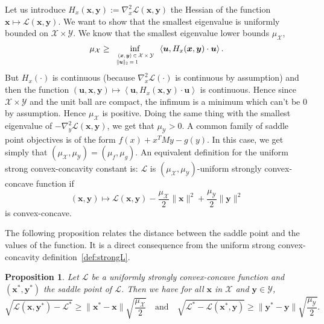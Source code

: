 \documentclass[twoside]{article}
\renewcommand{\L}{\mathcal{L}}
\newcommand{\X}{\mathcal{X}}
\newcommand{\Y}{\mathcal{Y}}
\newcommand{\M}{\X \times \Y}
\newcommand{\prodscal}[2]{\left\langle#1,#2\right\rangle}
\newcommand{\x}{\bm{x}}
\newcommand{\y}{\bm{y}}
\renewcommand{\u}{\bm{u}}
\newtheorem{proposition}[definition]{Proposition}
\newcommand{\0}{\mathbf{0}} %
\begin{document}
  \proof
    Let us introduce $H_x(\x,\y):= \nabla_x^2 \L(\x,\y)$ the Hessian of the function $\x \mapsto \L(\x,\y)$. We want to show that the smallest eigenvalue is uniformly bounded on $\M$. We know that the smallest eigenvalue lower bounds $\mu_\X$,
      \begin{equation} 
        \mu_{\X} \geq \inf_{\substack{\scalebox{0.65}{
                $\begin{array}{ll}
                    \; (\x,\y) \in \M \\
                    \|\u\|_2=1
                \end{array}$
                }}} \prodscal{\u}{H_x(\x,\y) \cdot\u}.
      \end{equation}
    But $H_x(\cdot)$ is continuous (because $\nabla_x^2 \L(\cdot)$ is continuous by assumption) and then the function $(\u,\x,\y) \mapsto \prodscal{\u}{H_x(\x,\y) \cdot\u}$ is continuous. 
    Hence since $\M$ and the unit ball are compact, the infimum is a minimum which can't be 0 by assumption. Hence $\mu_\X$ is positive. 
    Doing the same thing with the smallest eigenvalue of $-\nabla_y^2 \L(\x,\y)$, we get that 
    $\mu_\Y>0$.
  \endproof
  A common  family of saddle point objectives is of the form $f(x) +x^TMy - g(y)$. In this case, we get simply that $\left( \mu_\X, \mu_\Y \right) = (\mu_f,\mu_g).$
  An equivalent definition for the uniform strong convex-concavity constant is: $\L$ is $(\mu_\X,\mu_\Y)$-uniform strongly convex-concave function if
  \begin{equation}
    \left( \x,\y \right) \mapsto\L(\x,\y) - \frac{\mu_\X}{2} \|\x\|^2 + \frac{\mu_\Y}{2} \|\y\|^2
  \end{equation}
  is convex-concave.

  The following proposition relates the distance between the saddle point and the values of the function. It is a direct consequence from the uniform strong convex-concavity definition~\eqref{def:strongL}.
  \begin{proposition}\label{prop:strongL}
    Let $\L$ be a uniformly strongly convex-concave function and $(\x^*,\y^*)$ the saddle point of $\L$. 
    Then we have for all $\x$ in $\X$ and $\y \in \Y$,
    \begin{equation} \sqrt{\L(\x,\y^*) - \L^*} \geq \|\x^*-\x\|\sqrt{\frac{\mu_\X}{2}} \quad  
     \text{and} \quad
     \sqrt{\L^* - \L(\x^*,\y)} \geq \|\y^*-\y\|\sqrt{\frac{\mu_\Y}{2}}.
    \end{equation} 
  \end{proposition}
\end{document}
